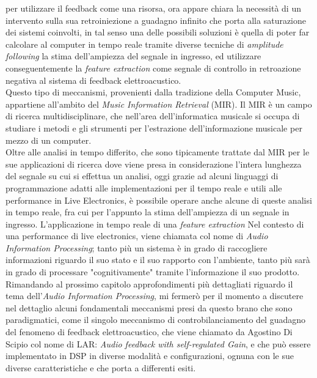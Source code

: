 per utilizzare il feedback come una risorsa,
ora appare chiara la necessità di un intervento sulla sua retroiniezione a guadagno infinito 
che porta alla saturazione dei sistemi coinvolti, 
in tal senso una delle possibili soluzioni è quella di poter far calcolare
al computer in tempo reale tramite diverse tecniche di \textit{amplitude following} la stima dell'ampiezza
del segnale in ingresso, ed utilizzare conseguentemente la \textit{feature extraction} 
come segnale di controllo in retroazione negativa al sistema di feedback elettroacustico. \\
Questo tipo di meccanismi, provenienti dalla tradizione della Computer Music, appartiene 
all'ambito del \textit{Music Information Retrieval} (MIR).
Il MIR è un campo di ricerca multidisciplinare, che nell'area dell’informatica musicale si occupa di
studiare i metodi e gli strumenti per l’estrazione dell’informazione musicale per mezzo di un
computer. \\
Oltre alle analisi in tempo differito, che sono tipicamente trattate dal MIR
per le sue applicazioni di ricerca dove viene presa in considerazione
l’intera lunghezza del segnale su cui si effettua un analisi, 
oggi grazie ad alcuni linguaggi di programmazione
adatti alle implementazioni per il tempo reale e utili alle
performance in Live Electronics, è possibile operare anche alcune
di queste analisi in tempo reale, fra cui per l'appunto la stima dell'ampiezza
di un segnale in ingresso.
L'applicazione in tempo reale di una \textit{feature extraction} 
Nel contesto di una performance di live electronics, viene chiamata col nome di
\textit{Audio Information Processing};
tanto più un sistema è in grado di raccogliere informazioni riguardo
il suo stato e il suo rapporto con l'ambiente, tanto più sarà in grado di
processare "cognitivamente" tramite l'informazione il suo prodotto. \\
Rimandando al prossimo capitolo approfondimenti più dettagliati riguardo il tema 
dell'\textit{Audio Information Processing}, mi fermerò per il momento a discutere 
nel dettaglio alcuni fondamentali meccanismi presi da questo brano che sono paradigmatici,
come il singolo meccanismo di controbilanciamento del guadagno
del fenomeno di feedback elettroacustico, che viene chiamato da Agostino Di Scipio col nome di 
LAR: \textit{Audio feedback with self-regulated Gain},
e che può essere implementato in DSP in diverse modalità e configurazioni,
ognuna con le sue diverse caratteristiche e che porta a differenti esiti. \\

